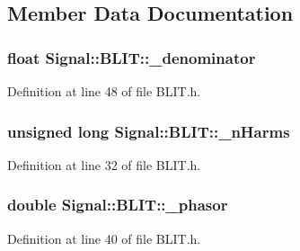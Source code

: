\subsection{Member Data Documentation}
\hypertarget{class_signal_1_1_b_l_i_t_a0219d8bf4a3c9ba979824ae269363885}{
\subsubsection[{\+\_\+denominator}]{\setlength{\rightskip}{0pt plus 5cm}float Signal\+::\+B\+L\+I\+T\+::\+\_\+denominator\hspace{0.3cm}{\ttfamily [protected]}}}\label{class_signal_1_1_b_l_i_t_a0219d8bf4a3c9ba979824ae269363885}


Definition at line 48 of file B\+L\+I\+T.\+h.

\hypertarget{class_signal_1_1_b_l_i_t_a9ec3a46bd37f7d76a8924dd7dd3622bd}{
\subsubsection[{\+\_\+n\+Harms}]{\setlength{\rightskip}{0pt plus 5cm}unsigned long Signal\+::\+B\+L\+I\+T\+::\+\_\+n\+Harms\hspace{0.3cm}{\ttfamily [protected]}}}\label{class_signal_1_1_b_l_i_t_a9ec3a46bd37f7d76a8924dd7dd3622bd}


Definition at line 32 of file B\+L\+I\+T.\+h.

\hypertarget{class_signal_1_1_b_l_i_t_ae5ca010acf48cd0df232462cfaf95a3a}{
\subsubsection[{\+\_\+phasor}]{\setlength{\rightskip}{0pt plus 5cm}double Signal\+::\+B\+L\+I\+T\+::\+\_\+phasor\hspace{0.3cm}{\ttfamily [protected]}}}\label{class_signal_1_1_b_l_i_t_ae5ca010acf48cd0df232462cfaf95a3a}


Definition at line 40 of file B\+L\+I\+T.\+h.


